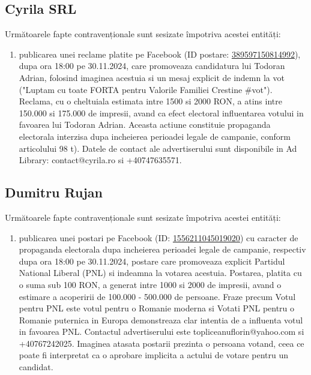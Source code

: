 \documentclass[a4paper,12pt]{article}
\begin{document}
\vspace{0.5cm}

\subsection{Cyrila SRL}
Următoarele fapte contravenționale sunt sesizate împotriva acestei entități:

\begin{enumerate}[leftmargin=*, label=\arabic*.)]
    \item publicarea unei reclame platite pe Facebook (ID postare: \href{https://www.facebook.com/ads/library/?id=389597150814992}{389597150814992}), dupa ora 18:00 pe 30.11.2024, care promoveaza candidatura lui Todoran Adrian, folosind imaginea acestuia si un mesaj explicit de indemn la vot ("Luptam cu toate FORTA pentru Valorile Familiei Crestine \#vot"). Reclama, cu o cheltuiala estimata intre 1500 si 2000 RON, a atins intre 150.000 si 175.000 de impresii, avand ca efect electoral influentarea votului in favoarea lui Todoran Adrian.  Aceasta actiune constituie propaganda electorala interzisa dupa incheierea perioadei legale de campanie, conform articolului 98 t).  Datele de contact ale advertiserului sunt disponibile in Ad Library: contact@cyrila.ro si +40747635571.
\end{enumerate}

\vspace{0.5cm}

\subsection{Dumitru Rujan}
Următoarele fapte contravenționale sunt sesizate împotriva acestei entități:

\begin{enumerate}[leftmargin=*, label=\arabic*.)]
    \item publicarea unei postari pe Facebook (ID: \href{https://www.facebook.com/ads/library/?id=1556211045019020}{1556211045019020}) cu caracter de propaganda electorala dupa incheierea perioadei legale de campanie, respectiv dupa ora 18:00 pe 30.11.2024,  postare care promoveaza explicit Partidul National Liberal (PNL) si indeamna la votarea acestuia.  Postarea, platita cu o suma sub 100 RON, a generat intre 1000 si 2000 de impresii, avand o estimare a acoperirii de 100.000 - 500.000 de persoane. Fraze precum Votul pentru PNL este votul pentru o Romanie moderna si Votati PNL pentru o Romanie puternica in Europa demonstreaza clar intentia de a influenta votul in favoarea PNL.  Contactul advertiserului este topliceanuflorin@yahoo.com si +40767242025.  Imaginea atasata postarii prezinta o persoana votand, ceea ce poate fi interpretat ca o aprobare implicita a actului de votare pentru un candidat.
\end{enumerate}
\end{document}
